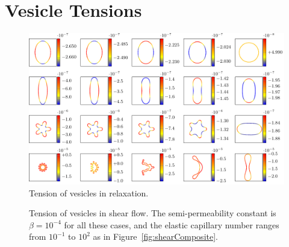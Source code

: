\documentclass[9pt,twocolumn,twoside,lineno]{pnas-new}
\newif\ifTikz
\begin{document}
\section*{Vesicle Tensions}
\begin{figure}[htp]
  \centering
  \ifTikz
    
  \else
    \includegraphics{figures/relaxationTensions.pdf}
  \fi
  \caption{\label{fig:relaxationTensions} Tension of vesicles in
  relaxation.}
\end{figure}

\begin{figure}[hbp]
  \caption{\label{fig:shearTensions} Tension of vesicles in
  shear flow. The semi-permeability constant is $\beta = 10^{-4}$ for
  all these cases, and the elastic capillary number ranges from
  $10^{-1}$ to $10^{2}$ as in Figure~\ref{fig:shearComposite}.}
\end{figure}
\end{document}
